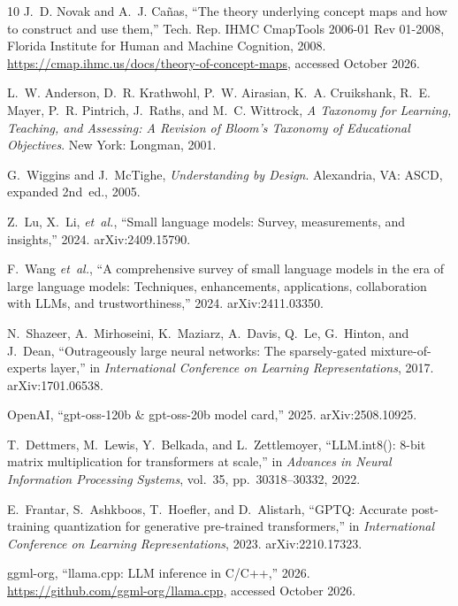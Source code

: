 \documentclass[11pt]{article}
\begin{document}
\begin{thebibliography}{10}
J.~D. Novak and A.~J. Ca{\~n}as, ``The theory underlying concept maps and how
  to construct and use them,'' Tech. Rep. IHMC CmapTools 2006-01 Rev 01-2008,
  Florida Institute for Human and Machine Cognition, 2008.
\newblock \url{https://cmap.ihmc.us/docs/theory-of-concept-maps}, accessed
  October 2026.

L.~W. Anderson, D.~R. Krathwohl, P.~W. Airasian, K.~A. Cruikshank, R.~E. Mayer,
  P.~R. Pintrich, J.~Raths, and M.~C. Wittrock, {\em A Taxonomy for Learning,
  Teaching, and Assessing: A Revision of {Bloom's} Taxonomy of Educational
  Objectives}.
\newblock New York: Longman, 2001.

G.~Wiggins and J.~McTighe, {\em Understanding by Design}.
\newblock Alexandria, VA: ASCD, expanded 2nd~ed., 2005.

Z.~Lu, X.~Li, {\em et~al.}, ``Small language models: Survey, measurements, and
  insights,'' 2024.
\newblock arXiv:2409.15790.

F.~Wang {\em et~al.}, ``A comprehensive survey of small language models in the
  era of large language models: Techniques, enhancements, applications,
  collaboration with {LLMs}, and trustworthiness,'' 2024.
\newblock arXiv:2411.03350.

N.~Shazeer, A.~Mirhoseini, K.~Maziarz, A.~Davis, Q.~Le, G.~Hinton, and J.~Dean,
  ``Outrageously large neural networks: The sparsely-gated mixture-of-experts
  layer,'' in {\em International Conference on Learning Representations}, 2017.
\newblock arXiv:1701.06538.

{OpenAI}, ``gpt-oss-120b \& gpt-oss-20b model card,'' 2025.
\newblock arXiv:2508.10925.

T.~Dettmers, M.~Lewis, Y.~Belkada, and L.~Zettlemoyer, ``{LLM.int8()}: 8-bit
  matrix multiplication for transformers at scale,'' in {\em Advances in Neural
  Information Processing Systems}, vol.~35, pp.~30318--30332, 2022.

E.~Frantar, S.~Ashkboos, T.~Hoefler, and D.~Alistarh, ``{GPTQ}: Accurate
  post-training quantization for generative pre-trained transformers,'' in {\em
  International Conference on Learning Representations}, 2023.
\newblock arXiv:2210.17323.

{ggml-org}, ``{llama.cpp}: {LLM} inference in {C/C++},'' 2026.
\newblock \url{https://github.com/ggml-org/llama.cpp}, accessed October 2026.


\end{thebibliography}
\end{document}

